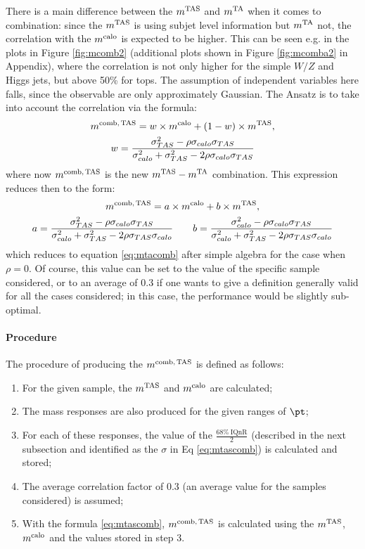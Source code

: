 There is a main difference between the $m^\textrm{TAS}$ and $m^\textrm{TA}$ when it comes to combination: since the $m^\textrm{TAS}$ is using subjet level information but $m^\textrm{TA}$ not, the correlation with the $m^\textrm{calo}$ is expected to be higher.
This can be seen e.g. in the plots in Figure \ref{fig:mcomb2} (additional plots shown in Figure \ref{fig:mcomba2} in Appendix), where the correlation is not only higher for the simple $W/Z$ and Higgs jets, but above 50\% for tops. The assumption of independent variables here falls, since the observable are only approximately Gaussian. The Ansatz is to take into account the correlation via the formula:
\begin{equation}
\begin{gathered}
m^\textrm{comb,\,TAS}= w\times m^\textrm{calo} + (1-w)\times m^\textrm{TAS},\\
w=\frac{\sigma_{TAS}^2-\rho\sigma_{calo}\sigma_{TAS}}{\sigma_{calo}^2+\sigma_{TAS}^2-2\rho\sigma_{calo}\sigma_{TAS}}
\end{gathered}
\label{eq:mtascomb}
\end{equation}
% 
where now $m^\textrm{comb,\,TAS}$ is the new $m^\textrm{TAS}-m^\textrm{TA}$ combination. This expression reduces then to the form:
\begin{equation}
\begin{gathered}
m^\textrm{comb,\,TAS}= a\times m^\textrm{calo} + b\times m^\textrm{TAS},\\
a=\frac{\sigma_{TAS}^2-\rho\sigma_{calo}\sigma_{TAS}}{\sigma_{calo}^2+\sigma_{TAS}^2-2\rho\sigma_{TAS}\sigma_{calo}}\qquad b=\frac{\sigma_{calo}^2-\rho\sigma_{calo}\sigma_{TAS}}{\sigma_{calo}^2+\sigma_{TAS}^2-2\rho\sigma_{TAS}\sigma_{calo}}
\end{gathered}
\end{equation}
which reduces to equation \eqref{eq:mtacomb} after simple algebra for the case when $\rho=0$. Of course, this value can be set to the value of the specific sample considered, or to an average of 0.3 if one wants to give a definition generally valid for all the cases considered; in this case, the performance would be slightly sub-optimal.

\paragraph{Procedure}
The procedure of producing the $m^\textrm{comb,\,TAS}$ is defined as follows:
\begin{enumerate}
 \item For the given sample, the $m^\textrm{TAS}$ and $m^\textrm{calo}$ are calculated;
 \item The mass responses are also produced for the given ranges of $\pt$;
 \item For each of these responses, the value of the $\frac{68\% \: \textrm{IQnR}}{2}$ (described in the next subsection and identified as the $\sigma$ in Eq \ref{eq:mtascomb}) is calculated and stored;
 \item The average correlation factor of 0.3 (an average value for the samples considered) is assumed;
 \item With the formula \ref{eq:mtascomb}, $m^\textrm{comb,\,TAS}$ is calculated using the $m^\textrm{TAS}$, $m^\textrm{calo}$ and the values stored in step 3.
\end{enumerate}

